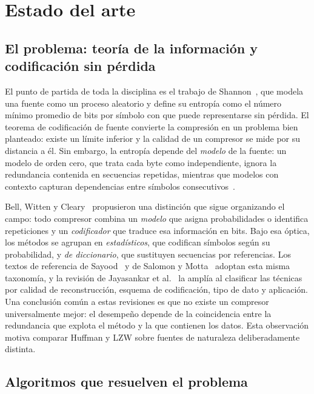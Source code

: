 \section{Estado del arte}
\label{sec:estado-arte}

\subsection{El problema: teoría de la información y codificación sin pérdida}
\label{sec:ea-problema}
El punto de partida de toda la disciplina es el trabajo de Shannon~\cite{shannon1948}, que
modela una fuente como un proceso aleatorio y define su entropía como el número mínimo
promedio de bits por símbolo con que puede representarse sin pérdida. El teorema de
codificación de fuente convierte la compresión en un problema bien planteado: existe un límite
inferior y la calidad de un compresor se mide por su distancia a él. Sin embargo, la entropía
depende del \emph{modelo} de la fuente: un modelo de orden cero, que trata cada byte como
independiente, ignora la redundancia contenida en secuencias repetidas, mientras que modelos
con contexto capturan dependencias entre símbolos consecutivos~\cite{bell1989}.

Bell, Witten y Cleary~\cite{bell1989} propusieron una distinción que sigue organizando el campo:
todo compresor combina un \emph{modelo} que asigna probabilidades o identifica repeticiones y
un \emph{codificador} que traduce esa información en bits. Bajo esa óptica, los métodos se
agrupan en \emph{estadísticos}, que codifican símbolos según su probabilidad, y \emph{de
diccionario}, que sustituyen secuencias por referencias. Los textos de referencia de
Sayood~\cite{sayood2017} y de Salomon y Motta~\cite{salomon2010} adoptan esta misma taxonomía, y
la revisión de Jayasankar et al.~\cite{jayasankar2021} la amplía al clasificar las técnicas por
calidad de reconstrucción, esquema de codificación, tipo de dato y aplicación. Una conclusión
común a estas revisiones es que no existe un compresor universalmente mejor: el desempeño
depende de la coincidencia entre la redundancia que explota el método y la que contienen los
datos. Esta observación motiva comparar Huffman y LZW sobre fuentes de naturaleza
deliberadamente distinta.

\subsection{Algoritmos que resuelven el problema}
\label{sec:ea-algoritmos}
